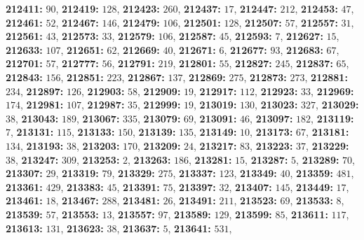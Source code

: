 \textsf{\bfseries 212411:} $90$, \textsf{\bfseries 212419:} $128$, \textsf{\bfseries 212423:} $260$, \textsf{\bfseries 212437:} $17$, \textsf{\bfseries 212447:} $212$, \textsf{\bfseries 212453:} $47$, \textsf{\bfseries 212461:} $52$, \textsf{\bfseries 212467:} $146$, \textsf{\bfseries 212479:} $106$, \textsf{\bfseries 212501:} $128$, \textsf{\bfseries 212507:} $57$, \textsf{\bfseries 212557:} $31$, \textsf{\bfseries 212561:} $43$, \textsf{\bfseries 212573:} $33$, \textsf{\bfseries 212579:} $106$, \textsf{\bfseries 212587:} $45$, \textsf{\bfseries 212593:} $7$, \textsf{\bfseries 212627:} $15$, \textsf{\bfseries 212633:} $107$, \textsf{\bfseries 212651:} $62$, \textsf{\bfseries 212669:} $40$, \textsf{\bfseries 212671:} $6$, \textsf{\bfseries 212677:} $93$, \textsf{\bfseries 212683:} $67$, \textsf{\bfseries 212701:} $57$, \textsf{\bfseries 212777:} $56$, \textsf{\bfseries 212791:} $219$, \textsf{\bfseries 212801:} $55$, \textsf{\bfseries 212827:} $245$, \textsf{\bfseries 212837:} $65$, \textsf{\bfseries 212843:} $156$, \textsf{\bfseries 212851:} $223$, \textsf{\bfseries 212867:} $137$, \textsf{\bfseries 212869:} $275$, \textsf{\bfseries 212873:} $273$, \textsf{\bfseries 212881:} $234$, \textsf{\bfseries 212897:} $126$, \textsf{\bfseries 212903:} $58$, \textsf{\bfseries 212909:} $19$, \textsf{\bfseries 212917:} $112$, \textsf{\bfseries 212923:} $33$, \textsf{\bfseries 212969:} $174$, \textsf{\bfseries 212981:} $107$, \textsf{\bfseries 212987:} $35$, \textsf{\bfseries 212999:} $19$, \textsf{\bfseries 213019:} $130$, \textsf{\bfseries 213023:} $327$, \textsf{\bfseries 213029:} $38$, \textsf{\bfseries 213043:} $189$, \textsf{\bfseries 213067:} $335$, \textsf{\bfseries 213079:} $69$, \textsf{\bfseries 213091:} $46$, \textsf{\bfseries 213097:} $182$, \textsf{\bfseries 213119:} $7$, \textsf{\bfseries 213131:} $115$, \textsf{\bfseries 213133:} $150$, \textsf{\bfseries 213139:} $135$, \textsf{\bfseries 213149:} $10$, \textsf{\bfseries 213173:} $67$, \textsf{\bfseries 213181:} $134$, \textsf{\bfseries 213193:} $38$, \textsf{\bfseries 213203:} $170$, \textsf{\bfseries 213209:} $24$, \textsf{\bfseries 213217:} $83$, \textsf{\bfseries 213223:} $37$, \textsf{\bfseries 213229:} $38$, \textsf{\bfseries 213247:} $309$, \textsf{\bfseries 213253:} $2$, \textsf{\bfseries 213263:} $186$, \textsf{\bfseries 213281:} $15$, \textsf{\bfseries 213287:} $5$, \textsf{\bfseries 213289:} $70$, \textsf{\bfseries 213307:} $29$, \textsf{\bfseries 213319:} $79$, \textsf{\bfseries 213329:} $275$, \textsf{\bfseries 213337:} $123$, \textsf{\bfseries 213349:} $40$, \textsf{\bfseries 213359:} $481$, \textsf{\bfseries 213361:} $429$, \textsf{\bfseries 213383:} $45$, \textsf{\bfseries 213391:} $75$, \textsf{\bfseries 213397:} $32$, \textsf{\bfseries 213407:} $145$, \textsf{\bfseries 213449:} $17$, \textsf{\bfseries 213461:} $18$, \textsf{\bfseries 213467:} $288$, \textsf{\bfseries 213481:} $26$, \textsf{\bfseries 213491:} $211$, \textsf{\bfseries 213523:} $69$, \textsf{\bfseries 213533:} $8$, \textsf{\bfseries 213539:} $57$, \textsf{\bfseries 213553:} $13$, \textsf{\bfseries 213557:} $97$, \textsf{\bfseries 213589:} $129$, \textsf{\bfseries 213599:} $85$, \textsf{\bfseries 213611:} $117$, \textsf{\bfseries 213613:} $131$, \textsf{\bfseries 213623:} $38$, \textsf{\bfseries 213637:} $5$, \textsf{\bfseries 213641:} $531$, 

